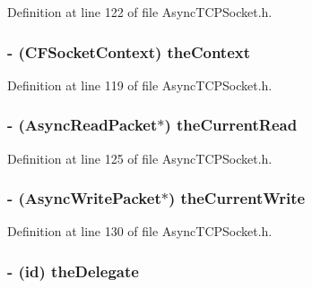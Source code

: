 Definition at line 122 of file AsyncTCPSocket.h.

\hypertarget{interface_async_t_c_p_socket_a87c18d99a5efbb5389832677241c01e9}{
\subsubsection[{theContext}]{\setlength{\rightskip}{0pt plus 5cm}-\/ (CFSocketContext) {\bf theContext}}}
\label{interface_async_t_c_p_socket_a87c18d99a5efbb5389832677241c01e9}


Definition at line 119 of file AsyncTCPSocket.h.

\hypertarget{interface_async_t_c_p_socket_a714c81240b36f60805ad3b26ad0a6ab5}{
\subsubsection[{theCurrentRead}]{\setlength{\rightskip}{0pt plus 5cm}-\/ ({\bf AsyncReadPacket}$\ast$) {\bf theCurrentRead}}}
\label{interface_async_t_c_p_socket_a714c81240b36f60805ad3b26ad0a6ab5}


Definition at line 125 of file AsyncTCPSocket.h.

\hypertarget{interface_async_t_c_p_socket_a9191ab2e393964fdcf1dfee1de495872}{
\subsubsection[{theCurrentWrite}]{\setlength{\rightskip}{0pt plus 5cm}-\/ ({\bf AsyncWritePacket}$\ast$) {\bf theCurrentWrite}}}
\label{interface_async_t_c_p_socket_a9191ab2e393964fdcf1dfee1de495872}


Definition at line 130 of file AsyncTCPSocket.h.

\hypertarget{interface_async_t_c_p_socket_a7e18c4829e83d7de259fa4c4cd78925b}{
\subsubsection[{theDelegate}]{\setlength{\rightskip}{0pt plus 5cm}-\/ (id) {\bf theDelegate}}}
\label{interface_async_t_c_p_socket_a7e18c4829e83d7de259fa4c4cd78925b}


